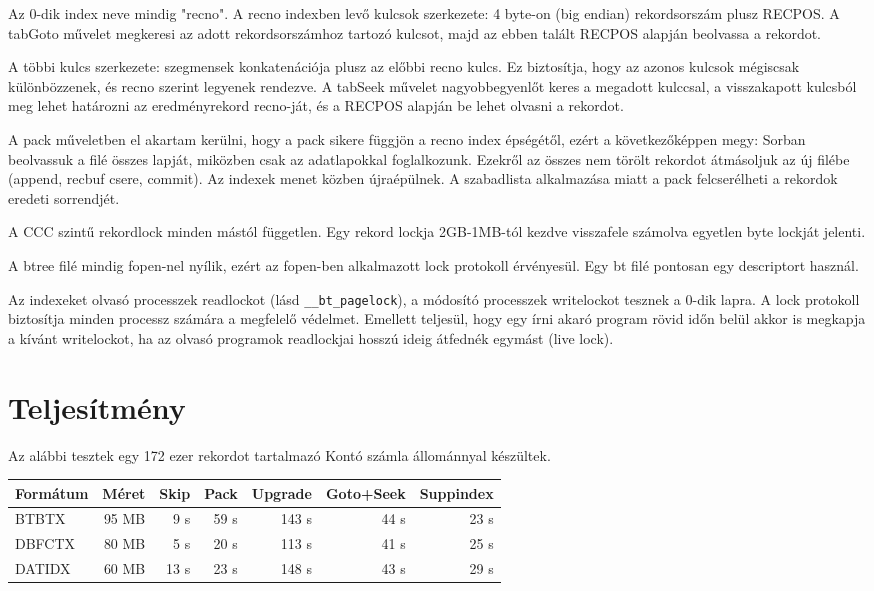 Az 0-dik index neve mindig "recno". A recno indexben levő kulcsok 
szerkezete: 4 byte-on (big endian) rekordsorszám plusz RECPOS.
A tabGoto művelet megkeresi az adott rekordsorszámhoz tartozó
kulcsot, majd az ebben talált RECPOS alapján beolvassa a rekordot.

A többi kulcs szerkezete: szegmensek konkatenációja plusz az előbbi recno
kulcs. Ez biztosítja, hogy az azonos kulcsok  mégiscsak különbözzenek,
és recno szerint legyenek rendezve. A tabSeek művelet nagyobbegyenlőt
keres a megadott kulccsal, a visszakapott kulcsból meg lehet
határozni az eredményrekord recno-ját, és a RECPOS alapján be lehet
olvasni a rekordot.

A pack műveletben el akartam kerülni, hogy a pack sikere
függjön a recno index épségétől, ezért a következőképpen megy:
Sorban beolvassuk a filé összes lapját, miközben csak az adatlapokkal
foglalkozunk. Ezekről az összes nem törölt rekordot átmásoljuk az
új filébe (append, recbuf csere, commit). Az indexek menet közben
újraépülnek. A szabadlista alkalmazása miatt a pack felcserélheti
a rekordok eredeti sorrendjét.

A CCC szintű rekordlock minden mástól független. Egy rekord lockja
2GB-1MB-tól kezdve visszafele számolva egyetlen byte lockját jelenti.

A btree filé mindig fopen-nel nyílik, ezért az fopen-ben alkalmazott
lock protokoll érvényesül. Egy bt filé pontosan egy descriptort használ.

Az indexeket olvasó processzek readlockot (lásd \verb!__bt_pagelock!),
a módosító processzek writelockot tesznek a 0-dik lapra. A lock
protokoll biztosítja minden processz számára a megfelelő védelmet.
Emellett teljesül, hogy egy írni akaró program rövid időn belül 
akkor is megkapja a kívánt writelockot, ha az olvasó programok readlockjai 
hosszú ideig átfednék egymást (live lock).


\section{Teljesítmény}
 
Az alábbi tesztek egy 172 ezer rekordot tartalmazó Kontó számla 
állománnyal készültek.

\begin{center}
\begin{tabular}{|l|r|r|r|r|r|r|}  \hline 
Formátum & Méret  & Skip  &  Pack  & Upgrade  & Goto+Seek  & Suppindex   \\ \hline  
BTBTX    &  95 MB &   9 s &   59 s &    143 s &       44 s &       23 s  \\ \hline
DBFCTX   &  80 MB &   5 s &   20 s &    113 s &       41 s &       25 s  \\ \hline
DATIDX   &  60 MB &  13 s &   23 s &    148 s &       43 s &       29 s  \\ \hline
\end{tabular}
\end{center}
 
